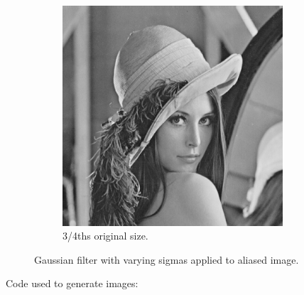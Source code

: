 \begin{figure}[h]
\begin{subfigure}[b]{0.3\textwidth}
        \includegraphics[width=0.9\textwidth]{../code/2_out/2-3_ds.png}
        \caption{3/4ths original size.}
        \label{fig:2-3:1}
    \end{subfigure}





\caption{Gaussian filter with varying sigmas applied to aliased image.}
\label{fig:2-3}
\end{figure}

Code used to generate images:
\inputminted[linenos=true]{octave}{../code/2.3.m}
